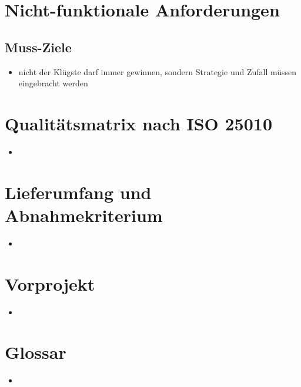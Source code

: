 \documentclass[11pt,a4paper]{scrreprt}
\begin{document}
\chapter{Nicht-funktionale Anforderungen}
\section{Muss-Ziele}
\begin{itemize}
\item nicht der Klügste darf immer gewinnen, sondern Strategie und Zufall müssen eingebracht werden
\end{itemize}
\chapter{Qualitätsmatrix nach ISO 25010}
\begin{itemize}
\item
\end{itemize}
\chapter{Lieferumfang und Abnahmekriterium}
\begin{itemize}
\item
\end{itemize}
\chapter{Vorprojekt}
\begin{itemize}
\item
\end{itemize}
\chapter{Glossar}
\begin{itemize}
\item
\end{itemize}
\end{document}
